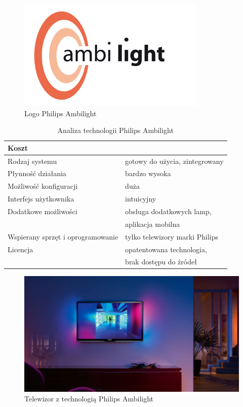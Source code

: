 \documentclass[12pt]{report}
\begin{document}
\begin{figure}[h]
\centering
\includegraphics[width=.7\textwidth]{../resources/ambilight.jpg}
\caption[Logo Philips Ambilight]{Logo Philips Ambilight \cite{ambilight}}
\end{figure}

\newpage

\begin{table}[h]
\centering
\begin{tabular}{| l | l |} 
\hline 
Koszt & \\ \hline
Rodzaj systemu & gotowy do użycia, zintegrowany \\ \hline
Płynność działania & bardzo wysoka \\ \hline
Możliwość konfiguracji & duża  \\ \hline
Interfejs użytkownika & intuicyjny  \\ \hline
Dodatkowe możliwości &  obsługa dodatkowych lamp, \\ \hline
&  aplikacja mobilna \\ \hline
Wspierany sprzęt i oprogramowanie &  tylko telewizory marki Philips   \\ \hline
Licencja & opatentowana technologia,  \\ \hline
& brak dostępu do źródeł  \\ \hline
\end{tabular} 
\caption{Analiza technologii Philips Ambilight}
\end{table}

\begin{figure}[h]
\centering
\includegraphics[width=\textwidth]{../resources/ambilight2.jpg}
\caption[Telewizor z technologią Philips Ambilight]{Telewizor z technologią Philips Ambilight \cite{ambilight2}}
\end{figure}
\end{document}
